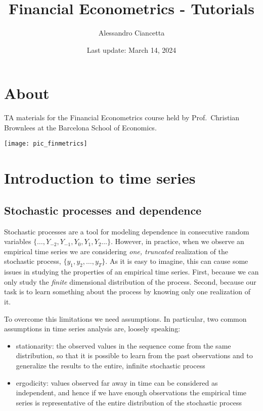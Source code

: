 \documentclass[
]{book}
\title{Financial Econometrics - Tutorials}
\author{Alessandro Ciancetta}
\date{Last update: March 14, 2024}
\begin{document}
\maketitle

{
\setcounter{tocdepth}{1}
\tableofcontents
}
\hypertarget{about}{%
\chapter*{About}\label{about}}

TA materials for the Financial Econometrics course held by Prof.~Christian Brownlees at the Barcelona School of Economics.

\begin{center}\texttt{[image: pic\_finmetrics]} \end{center}

\hypertarget{session01}{%
\chapter{Introduction to time series}\label{session01}}

\hypertarget{stochastic-processes-and-dependence}{%
\section{Stochastic processes and dependence}\label{stochastic-processes-and-dependence}}

Stochastic processes are a tool for modeling dependence in consecutive random variables \(\{\dots, Y_{-2}, Y_{-1}, Y_{0}, Y_{1}, Y_{2} \dots\}\). However, in practice, when we observe an empirical time series we are considering \emph{one, truncated} realization of the stochastic process, \(\{y_1, y_2, \dots, y_T\}\). As it is easy to imagine, this can cause some issues in studying the properties of an empirical time series. First, because we can only study the \emph{finite} dimensional distribution of the process. Second, because our task is to learn something about the process by knowing only one realization of it.

To overcome this limitations we need assumptions. In particular, two common assumptions in time series analysis are, loosely speaking:

\begin{itemize}
\item
  stationarity: the observed values in the sequence come from the same distribution, so that it is possible to learn from the past observations and to generalize the results to the entire, infinite stochastic process
\item
  ergodicity: values observed far away in time can be considered as independent, and hence if we have enough observations the empirical time series is representative of the entire distribution of the stochastic process
\end{itemize}
\end{document}
